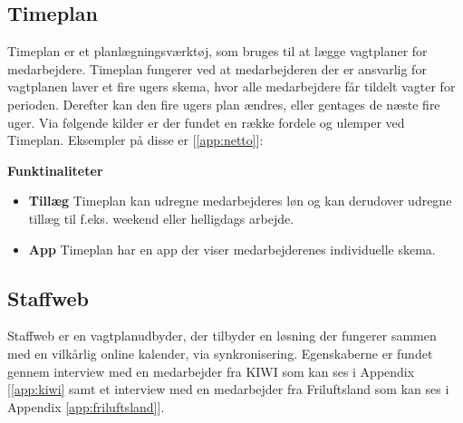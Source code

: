 
\subsection{Timeplan}
Timeplan er et planlægningsværktøj, som bruges til at lægge vagtplaner for medarbejdere. Timeplan fungerer ved at medarbejderen der er ansvarlig for vagtplanen laver et fire ugers skema, hvor alle medarbejdere får tildelt vagter for perioden. Derefter kan den fire ugers plan ændres, eller gentages de næste fire uger. Via følgende kilder er der fundet en række fordele og ulemper ved Timeplan. Eksempler på disse er \citep{timeplan} [\ref{app:netto}]:

\textbf{Funktinaliteter}
\begin{itemize}
\item {\textbf{Tillæg} Timeplan kan udregne medarbejderes løn og kan derudover udregne tillæg til f.eks. weekend eller helligdags arbejde.}
\item {\textbf{App} Timeplan har en app der viser medarbejderenes individuelle skema.}
\end{itemize}


\subsection{Staffweb}

Staffweb er en vagtplanudbyder, der tilbyder en løsning der fungerer sammen med en vilkårlig online kalender, via synkronisering. Egenskaberne er fundet gennem interview med en medarbejder fra KIWI som kan ses i Appendix [\ref{app:kiwi} samt et interview med en medarbejder fra Friluftsland som kan ses i Appendix \ref{app:friluftsland}].

